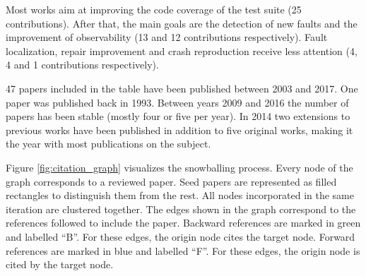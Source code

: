 Most works aim at improving the code coverage of the test suite (25 contributions). 
After that, the main goals are the detection of new faults and the improvement of observability  (13 and 12 contributions respectively). 
Fault localization, repair improvement and crash reproduction receive less attention (4, 4 and 1 contributions respectively).

47 papers included in the table have been published between 2003 and 2017. 
One paper was published back in 1993. 
Between years 2009 and 2016 the number of papers has been stable (mostly four or five per year). 
In 2014 two extensions to previous works have been published in addition to five original works, making it the year with most publications on the subject.

Figure \ref{fig:citation_graph} visualizes the snowballing process. 
Every node of the graph corresponds to a reviewed paper. 
Seed papers are represented as filled rectangles to distinguish them from the rest. 
All nodes incorporated in the same iteration are clustered together. 
The edges shown in the graph correspond to the references followed to include the paper. 
Backward references are marked in green and labelled ``B''. 
For these edges, the origin node cites the target node. 
Forward references are marked in blue and labelled ``F''. 
For these edges, the origin node is cited by the target node.

